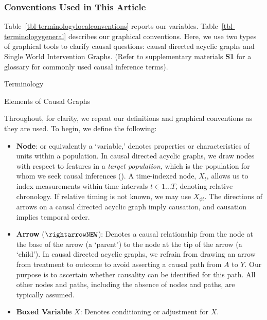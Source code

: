 \documentclass[
  single column]{article}
\begin{document}
\subsubsection{Conventions Used in This
Article}\label{conventions-used-in-this-article}

Table~\ref{tbl-terminologylocalconventions} reports our variables.
Table~\ref{tbl-terminologygeneral} describes our graphical conventions.
Here, we use two types of graphical tools to clarify causal questions:
causal directed acyclic graphs and Single World Intervention Graphs.
(Refer to supplementary materials \textbf{S1} for a glossary for
commonly used causal inference terms).

\begin{table}

\caption{\label{tbl-terminologylocalconventions}Terminology}

\centering{

\terminologylocalconventions

}

\end{table}%

\begin{table}

\caption{\label{tbl-terminologygeneral}Elements of Causal Graphs}

\centering{

\terminologygeneral

}

\end{table}%

Throughout, for clarity, we repeat our definitions and graphical
conventions as they are used. To begin, we define the following:

\begin{itemize}
\item
  \textbf{Node}: or equivalently a `variable,' denotes properties or
  characteristics of units within a population. In causal directed
  acyclic graphs, we draw nodes with respect to features in a
  \emph{target population}, which is the population for whom we seek
  causal inferences (). A
  time-indexed node, \(X_t\), allows us to index measurements within
  time intervals \(t \in 1\dots T\), denoting relative chronology. If
  relative timing is not known, we may use \(X_{\phi t}\). The
  directions of arrows on a causal directed acyclic graph imply
  causation, and causation implies temporal order.
\item
  \textbf{Arrow} (\(\rightarrowNEW\)): Denotes a causal relationship
  from the node at the base of the arrow (a `parent') to the node at the
  tip of the arrow (a `child'). In causal directed acyclic graphs, we
  refrain from drawing an arrow from treatment to outcome to avoid
  asserting a causal path from \(A\) to \(Y\). Our purpose is to
  ascertain whether causality can be identified for this path. All other
  nodes and paths, including the absence of nodes and paths, are
  typically assumed.
\item
  \textbf{Boxed Variable} \(\boxed{X}\): Denotes conditioning or
  adjustment for \(X\).
\end{itemize}
\end{document}
